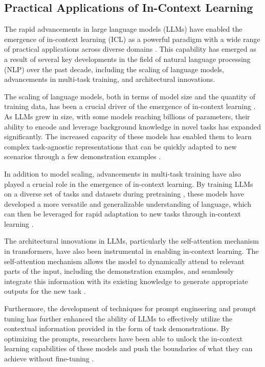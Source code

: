 \documentclass[11pt]{article}
\begin{document}
\subsection{Practical Applications of In-Context Learning}

The rapid advancements in large language models (LLMs) have enabled the emergence of in-context learning (ICL) as a powerful paradigm with a wide range of practical applications across diverse domains \cite{ref25}. This capability has emerged as a result of several key developments in the field of natural language processing (NLP) over the past decade, including the scaling of language models, advancements in multi-task training, and architectural innovations.

The scaling of language models, both in terms of model size and the quantity of training data, has been a crucial driver of the emergence of in-context learning \cite{ref18}. As LLMs grew in size, with some models reaching billions of parameters, their ability to encode and leverage background knowledge in novel tasks has expanded significantly. The increased capacity of these models has enabled them to learn complex task-agnostic representations that can be quickly adapted to new scenarios through a few demonstration examples \cite{ref19}.

In addition to model scaling, advancements in multi-task training have also played a crucial role in the emergence of in-context learning. By training LLMs on a diverse set of tasks and datasets during pretraining \cite{ref20}, these models have developed a more versatile and generalizable understanding of language, which can then be leveraged for rapid adaptation to new tasks through in-context learning \cite{ref21}.

The architectural innovations in LLMs, particularly the self-attention mechanism in transformers, have also been instrumental in enabling in-context learning. The self-attention mechanism allows the model to dynamically attend to relevant parts of the input, including the demonstration examples, and seamlessly integrate this information with its existing knowledge to generate appropriate outputs for the new task \cite{ref13}.

Furthermore, the development of techniques for prompt engineering and prompt tuning \cite{ref3} has further enhanced the ability of LLMs to effectively utilize the contextual information provided in the form of task demonstrations. By optimizing the prompts, researchers have been able to unlock the in-context learning capabilities of these models and push the boundaries of what they can achieve without fine-tuning \cite{ref22}.
\end{document}
